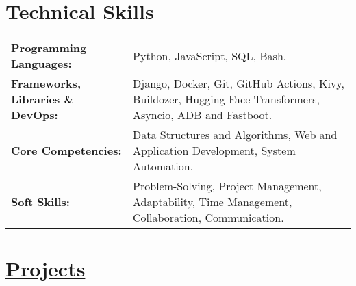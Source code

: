 \documentclass[a4paper,10pt]{article}
\begin{document}
\section{Technical Skills}
\vspace{2.5pt}
\begin{tabularx}{\linewidth}{@{} l X @{}}
    \textbf{Programming Languages:} & Python, JavaScript, SQL, Bash. \\
    \vspace{2.5pt}
    \textbf{Frameworks, Libraries \& DevOps:} & Django, Docker, Git, GitHub Actions, Kivy, Buildozer, Hugging Face Transformers, Asyncio, ADB and Fastboot. \\
    \vspace{2.5pt}
    \textbf{Core Competencies:} & Data Structures and Algorithms, Web and Application Development, System Automation. \\
    \vspace{2.5pt}
    \textbf{Soft Skills:} & Problem-Solving, Project Management, Adaptability, Time Management, Collaboration, Communication. \\
\end{tabularx}

\vspace{-5pt}

\newcommand{\projectentry}[5]{%
    \noindent\vspace{5pt}
    \textcolor{myblue}{\textbf{\href{#2}{#1}}} \textcolor{mydarkblue}{\href{#3}{\faLink}} %
    \hfill {\small\textbf{\textcolor{mylightpurple}{#5}}} \\ \vspace{-10pt} %

    \begin{itemize}[left=0pt, label=--, nosep]
        \item \vspace{-10pt}\textbf{Overview:} #4
    \end{itemize}
    \vspace{0pt} %
}


\vspace{-3pt}
\section{\href{https://github.com/deekshith0509?tab=repositories}{Projects}}
\end{document}

